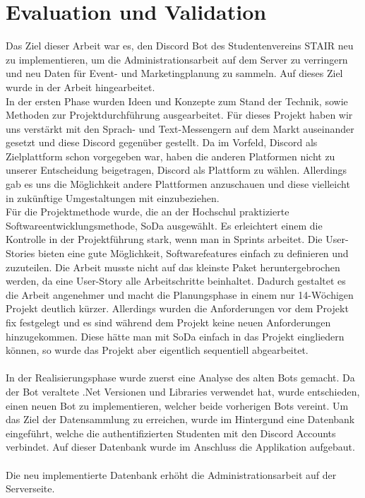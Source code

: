 \documentclass[a4paper, table]{article}
\begin{document}
\section{Evaluation und Validation}
Das Ziel dieser Arbeit war es, den Discord Bot des Studentenvereins STAIR neu zu implementieren, um die Administrationsarbeit auf dem Server zu verringern und neu Daten für Event- und Marketingplanung zu sammeln.
Auf dieses Ziel wurde in der Arbeit hingearbeitet.\\
In der ersten Phase wurden Ideen und Konzepte zum Stand der Technik, sowie Methoden zur Projektdurchführung ausgearbeitet.
Für dieses Projekt haben wir uns verstärkt mit den Sprach- und Text-Messengern auf dem Markt auseinander gesetzt und diese Discord gegenüber gestellt.
Da im Vorfeld, Discord als Zielplattform schon vorgegeben war, haben die anderen Platformen nicht zu unserer Entscheidung beigetragen, Discord als Plattform zu wählen.
Allerdings gab es uns die Möglichkeit andere Plattformen anzuschauen und diese vielleicht in zukünftige Umgestaltungen mit einzubeziehen.\\
Für die Projektmethode wurde, die an der Hochschul praktizierte Softwareentwicklungsmethode, \gls{SoDa} ausgewählt.
Es erleichtert einem die Kontrolle in der Projektführung stark, wenn man in Sprints arbeitet.
Die User-Stories bieten eine gute Möglichkeit, Softwarefeatures einfach zu definieren und zuzuteilen.
Die Arbeit musste nicht auf das kleinste Paket heruntergebrochen werden, da eine User-Story alle Arbeitschritte beinhaltet.
Dadurch gestaltet es die Arbeit angenehmer und macht die Planungsphase in einem nur 14-Wöchigen Projekt deutlich kürzer.
Allerdings wurden die Anforderungen vor dem Projekt fix festgelegt und es sind während dem Projekt keine neuen Anforderungen hinzugekommen.
Diese hätte man mit SoDa einfach in das Projekt eingliedern können, so wurde das Projekt aber eigentlich sequentiell abgearbeitet.\\\\
In der Realisierungsphase wurde zuerst eine Analyse des alten Bots gemacht.
Da der Bot veraltete .Net Versionen und Libraries verwendet hat, wurde entschieden, einen neuen Bot zu implementieren, welcher beide vorherigen Bots vereint.
Um das Ziel der Datensammlung zu erreichen, wurde im Hintergund eine Datenbank eingeführt, welche die authentifizierten Studenten mit den Discord Accounts verbindet.
Auf dieser Datenbank wurde im Anschluss die Applikation aufgebaut.\\\\
Die neu implementierte Datenbank erhöht die Administrationsarbeit auf der Serverseite.
\end{document}
